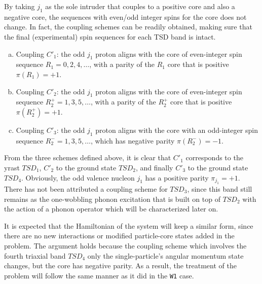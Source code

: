 \documentclass[11pt]{article}
\begin{document}
By taking $j_1$ as the sole intruder that couples to a positive core and also a negative core, the sequences with even/odd integer spins for the core does not change. In fact, the coupling schemes can be readily obtained, making sure that the final (experimental) spin sequences for each TSD band is intact. 

\begin{enumerate}[(a)]
    \item Coupling $C'_1$: the odd $j_1$ proton aligns with the core of even-integer spin sequence $R_1=0,2,4,\dots$, with a parity of the $R_1$ core that is positive $\pi(R_1)=+1$.
    \item Coupling $C'_2$: the odd $j_1$ proton aligns with the core of even-integer spin sequence $R_2^+=1,3,5,\dots$, with a parity of the $R_2^+$ core that is positive $\pi(R_2^+)=+1$.
    \item Coupling $C'_3$: the odd $j_1$ proton aligns with the core with an odd-integer spin sequence $R_2^-=1,3,5,\dots$, which has negative parity $\pi(R_2^-)=-1$.
\end{enumerate}

From the three schemes defined above, it is clear that $C'_1$ corresponds to the yrast $TSD_1$, $C'_2$ to the ground state $TSD_2$, and finally $C'_3$ to the ground state $TSD_4$. Obviously, the odd valence nucleon $j_1$ has a positive parity $\pi_{j_1}=+1$. There has not been attributed a coupling scheme for $TSD_3$, since this band still remains as the one-wobbling phonon excitation that is built on top of $TSD_2$ with the action of a phonon operator which will be characterized later on.

It is expected that the Hamiltonian of the system will keep a similar form, since there are no new interactions or modified particle-core states added in the problem. The argument holds because the coupling scheme which involves the fourth triaxial band $TSD_4$ only the single-particle's angular momentum state changes, but the core has negative parity. As a result, the treatment of the problem will follow the same manner as it did in the \texttt{W1} case.
\end{document}
